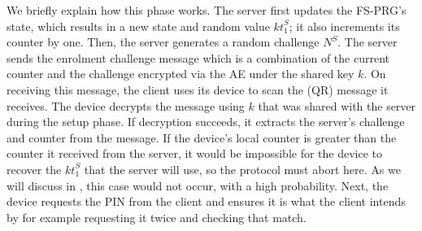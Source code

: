 \documentclass[runningheads]{llncs}
\newcommand{\sss}{\scriptscriptstyle}
\newcommand{\nonce}{\ensuremath{{N}}}
\newcommand{\keyt}{\ensuremath{{kt}}}
\newcommand{\pin}{\ensuremath{\mathsf{PIN}}}
\renewcommand{\verifier}{\ensuremath{{v}}}
\newcommand{\VC}[1]{\ensuremath{#1^{\sss C}}}
\newcommand{\VS}[1]{\ensuremath{#1^{\sss S}}}
\newcommand{\VM}[1]{\ensuremath{#1^{\sss M}}}
\newcommand{\iif}{\ensuremath{\text{If\ }}}
\begin{document}




We briefly explain how this phase works.  The server first updates the FS-PRG's state, which results in a new state and random value \VS{\keyt_{\sss 1}}; it also increments its counter by one. Then, the server generates a random challenge \VS{\nonce}. The server sends the enrolment challenge message which is a combination of the current counter and the challenge encrypted via the AE under the shared key $k$.
%
 On receiving this message, the client uses its device to scan the (QR) message it receives. The device decrypts the message using $k$ that was shared with the server during the setup phase.  If decryption succeeds, it  extracts the server's challenge and counter from the message.  If the device's local counter is greater than the counter it received from the server, it would be impossible for the device to recover the $\VS{\keyt_{\sss 1}}$ that the server will use, so the protocol must abort here. As we will discuss in , this case would not occur, with a high probability. Next, the device requests the PIN from the client and ensures it is what the client intends by for example requesting it twice and checking that match.
\end{document}

